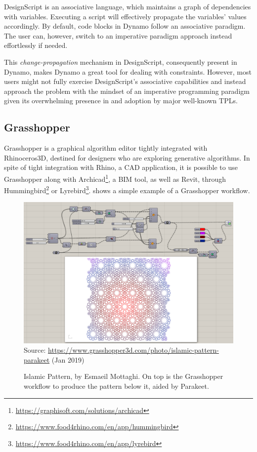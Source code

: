 DesignScript is an associative language, which maintains a graph of dependencies
with variables.  Executing a script will effectively propagate the variables'
values accordingly.  By default, code blocks in Dynamo follow an associative
paradigm.  The user can, however, switch to an imperative paradigm approach
instead effortlessly if needed.

This \textit{change-propagation} mechanism in DesignScript, consequently present
in Dynamo, makes Dynamo a great tool for dealing with constraints.  However,
most users might not fully exercise DesignScript's associative capabilities and
instead approach the problem with the mindset of an imperative programming
paradigm given its overwhelming presence in and adoption by major well-known
\acp{TPL}.

\subsection{Grasshopper}%
\label{sec:related.ad.grasshopper}

Grasshopper is a graphical algorithm editor tightly integrated with
Rhinoceros3D, destined for designers who are exploring generative algorithms.
In spite of tight integration with Rhino, a \ac{CAD} application, it is possible
to use Grasshopper along with
Archicad\textsuperscript{\textregistered}\footnote{\url{https://graphisoft.com/solutions/archicad}},
a \ac{BIM} tool, as well as Revit, through
Hummingbird\footnote{\url{https://www.food4rhino.com/en/app/hummingbird}} or
Lyrebird\footnote{\url{https://www.food4rhino.com/en/app/lyrebird}}.
 shows a simple example of a
Grasshopper workflow.

\begin{figure}[htb]
  \includegraphics[width=\textwidth]{fig/grasshopper-islamic-pattern}\\
  {\scriptsize
  Source: \url{https://www.grasshopper3d.com/photo/islamic-pattern-parakeet}
  (Jan 2019)
  }
  \caption[Islamic Pattern in Grasshopper using Parakeet]{
    Islamic Pattern, by Esmaeil Mottaghi.  On top is the Grasshopper workflow to
    produce the pattern below it, aided by
    Parakeet\footnotemark.}%
  \label{fig:related.ad.grasshopper.islamic-pattern}
\end{figure}

